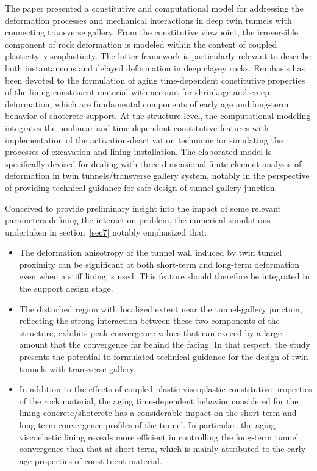 \documentclass[Journal,letterpaper, NoLists,SectionNumbers]{ascelike-new}
\begin{document}
The paper presented a constitutive and computational model for addressing the deformation processes and mechanical interactions in deep twin tunnels with connecting transverse gallery. From the constitutive viewpoint, the irreversible component of rock deformation is modeled within the context of coupled plasticity–viscoplasticity. The latter framework is particularly relevant to describe both instantaneous and delayed deformation in deep clayey rocks. Emphasis has been devoted to the formulation of aging time-dependent constitutive properties of the lining constituent material with account for shrinkage and creep deformation, which are fundamental components of early age and long-term behavior of shotcrete support. At the structure level, the computational modeling integrates the nonlinear and time-dependent constitutive features with implementation of the activation-deactivation technique for simulating the processes of excavation and lining installation. The elaborated model is specifically devised for dealing with three-dimensional finite element analysis of deformation in twin tunnels/transverse gallery system, notably in the perspective of providing technical guidance for safe design of tunnel-gallery junction.

Conceived to provide preliminary insight into the impact of some relevant parameters defining the interaction problem, the numerical simulations undertaken in section~\ref{sec7} notably emphasized that:

\begin{itemize}
	
	\item The deformation anisotropy of the tunnel wall induced by twin tunnel proximity can be significant at both short-term and long-term deformation even when a stiff lining is used. This feature should therefore be integrated in the support design stage.
	
	\item The disturbed region with localized extent near the tunnel-gallery junction, reflecting the strong interaction between these two components of the structure, exhibits peak convergence values that can exceed by a large amount that the convergence far behind the facing. In that respect, the study presents the potential to formulated technical guidance for the design of twin tunnels with transverse gallery.
	
	\item In addition to the effects of coupled plastic-viscoplastic constitutive properties of the rock material, the aging time-dependent behavior considered for the lining concrete/shotcrete has a considerable impact on the short-term and long-term convergence profiles of the tunnel. In particular, the aging viscoelastic lining reveals more efficient in controlling the long-term tunnel convergence than that at short term, which is mainly attributed to the early age properties of constituent material.
	
\end{itemize}
\end{document}
